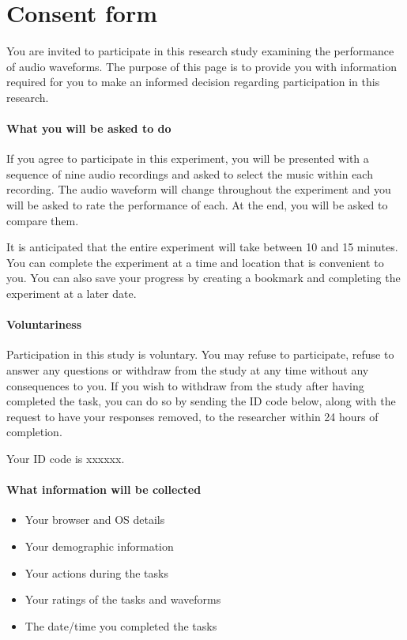 \section{Consent form}\label{app:consent}
You are invited to participate in this research study examining the performance
of audio waveforms. The purpose of this page is to provide you with information
required for you to make an informed decision regarding participation in this
research.

\paragraph{What you will be asked to do}
If you agree to participate in this experiment, you will be presented with a
sequence of nine audio recordings and asked to select the music within each
recording. The audio waveform will change throughout the experiment and you
will be asked to rate the performance of each. At the end, you will be asked to
compare them.

It is anticipated that the entire experiment will take between 10 and 15
minutes. You can complete the experiment at a time and location that is
convenient to you. You can also save your progress by creating a bookmark and
completing the experiment at a later date.

\paragraph{Voluntariness}
Participation in this study is voluntary. You may refuse to participate, refuse
to answer any questions or withdraw from the study at any time without any
consequences to you. If you wish to withdraw from the study after having
completed the task, you can do so by sending the ID code below, along with the
request to have your responses removed, to the researcher within 24 hours of
completion.

Your ID code is xxxxxx.

\paragraph{What information will be collected}
{\singlespacing
\begin{itemize}
\item Your browser and OS details
\item Your demographic information
\item Your actions during the tasks
\item Your ratings of the tasks and waveforms
\item The date/time you completed the tasks
\end{itemize}
}

